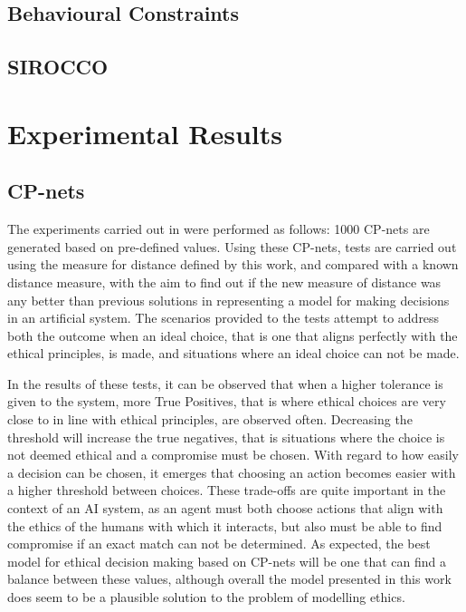 \documentclass{svproc}
\begin{document}
\subsection{Behavioural Constraints}

\subsection{SIROCCO}

\section{Experimental Results}
\subsection{CP-nets}
\par 
The experiments carried out in \cite{loreggia} were performed as follows: 1000 CP-nets are generated based on pre-defined values. Using these CP-nets, tests are carried out using the measure for distance defined by this work, and compared with a known distance measure, with the aim to find out if the new measure of distance was any better than previous solutions in representing a model for making decisions in an artificial system. The scenarios provided to the tests attempt to address both the outcome when an ideal choice, that is one that aligns perfectly with the ethical principles, is made, and situations where an ideal choice can not be made.
\par
In the results of these tests, it can be observed that when a higher tolerance is given to the system, more True Positives, that is where ethical choices are very close to in line with ethical principles, are observed often. Decreasing the threshold will increase the true negatives, that is situations where the choice is not deemed ethical and a compromise must be chosen. With regard to how easily a decision can be chosen, it emerges that choosing an action becomes easier with a higher threshold between choices.
These trade-offs are quite important in the context of an AI system, as an agent must both choose actions that align with the ethics of the humans with which it interacts, but also must be able to find compromise if an exact match can not be determined. As expected, the best model for ethical decision making based on CP-nets will be one that can find a balance between these values, although overall the model presented in this work does seem to be a plausible solution to the problem of modelling ethics.
\end{document}
